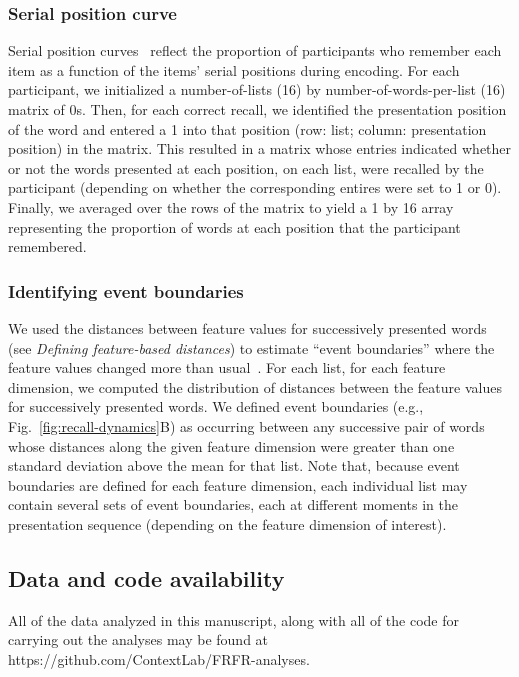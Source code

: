 \documentclass[11pt]{article}
\begin{document}
\subsubsection*{Serial position curve}

Serial position curves~\citep{Murd62a} reflect the proportion of participants
who remember each item as a function of the items' serial positions during
encoding. For each participant, we initialized a number-of-lists (16) by
number-of-words-per-list (16) matrix of 0s. Then, for each correct recall, we
identified the presentation position of the word and entered a 1 into that
position (row: list; column: presentation position) in the matrix. This
resulted in a matrix whose entries indicated whether or not the words presented
at each position, on each list, were recalled by the participant (depending on
whether the corresponding entires were set to 1 or 0). Finally, we averaged
over the rows of the matrix to yield a 1 by 16 array representing the
proportion of words at each position that the participant remembered.

\subsubsection*{Identifying event boundaries}

We used the distances between feature values for successively presented words
(see \textit{Defining feature-based distances}) to estimate ``event
boundaries'' where the feature values changed more than
usual~\citep{EzzyDava11, MannEtal16,RadvCope06, SwalEtal09, SwalEtal11,
DuBrDava16}. For each list, for each feature dimension, we computed the
distribution of distances between the feature values for successively presented
words. We defined event boundaries (e.g., Fig.~\ref{fig:recall-dynamics}B) as
occurring between any successive pair of words whose distances along the given
feature dimension were greater than one standard deviation above the mean for
that list. Note that, because event boundaries are defined for each feature
dimension, each individual list may contain several sets of event boundaries,
each at different moments in the presentation sequence (depending on the
feature dimension of interest).

\subsection*{Data and code availability}

All of the data analyzed in this manuscript, along with all of the code for
carrying out the analyses may be found at https://github.com/ContextLab/FRFR-analyses.
\end{document}
